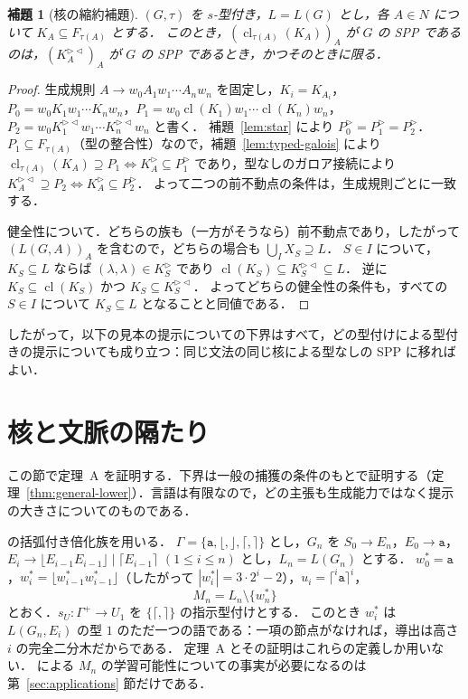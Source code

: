 \documentclass[11pt,a4paper]{ltjsarticle}
\numberwithin{equation}{section}
\theoremstyle{plain}
\newtheorem{lemma}[theorem]{補題}
\theoremstyle{definition}
\theoremstyle{remark}
\theoremstyle{plain}
\newcommand{\eps}{\lambda}
\newcommand{\R}{^{\rhd}}
\newcommand{\RL}{^{\rhd\lhd}}
\newcommand{\cl}{\operatorname{cl}}
\newcommand{\Lfl}{\lfloor}
\newcommand{\Rfl}{\rfloor}
\newcommand{\Lce}{\lceil}
\newcommand{\Rce}{\rceil}
\newcommand{\ta}{\mathtt a}
\begin{document}
\begin{lemma}[核の縮約補題]\label{lem:reduction}
$(G,\tau)$ を $s$-型付き，$L=L(G)$ とし，各 $A\in N$ について $K_A\subseteq F_{\tau(A)}$ とする．
このとき，$(\cl_{\tau(A)}(K_A))_A$ が $G$ の SPP であるのは，$(K_A\RL)_A$ が $G$ の SPP であるとき，かつそのときに限る．
\end{lemma}
\begin{proof}
生成規則 $A\to w_0A_1w_1\cdots A_nw_n$ を固定し，$K_i=K_{A_i}$，
$P_0=w_0K_1w_1\cdots K_nw_n$，$P_1=w_0\cl(K_1)w_1\cdots\cl(K_n)w_n$，$P_2=w_0K_1\RL w_1\cdots K_n\RL w_n$ と書く．
補題~\ref{lem:star} により $P_0\R=P_1\R=P_2\R$．
$P_1\subseteq F_{\tau(A)}$（型の整合性）なので，補題~\ref{lem:typed-galois} により
$\cl_{\tau(A)}(K_A)\supseteq P_1\iff K_A\R\subseteq P_1\R$ であり，型なしのガロア接続により $K_A\RL\supseteq P_2\iff K_A\R\subseteq P_2\R$．
よって二つの前不動点の条件は，生成規則ごとに一致する．

健全性について．どちらの族も（一方がそうなら）前不動点であり，したがって $(L(G,A))_A$ を含むので，どちらの場合も $\bigcup_I X_S\supseteq L$．
$S\in I$ について，$K_S\subseteq L$ ならば $(\eps,\eps)\in K_S\R$ であり $\cl(K_S)\subseteq K_S\RL\subseteq L$．
逆に $K_S\subseteq\cl(K_S)$ かつ $K_S\subseteq K_S\RL$．
よってどちらの健全性の条件も，すべての $S\in I$ について $K_S\subseteq L$ となることと同値である．
\end{proof}
したがって，以下の見本の提示についての下界はすべて，どの型付けによる型付きの提示についても成り立つ：同じ文法の同じ核による型なしの SPP に移ればよい．

\section{核と文脈の隔たり}\label{sec:deletion}

この節で定理~A を証明する．下界は一般の捕獲の条件のもとで証明する（定理~\ref{thm:general-lower}）．言語は有限なので，どの主張も生成能力ではなく提示の大きさについてのものである．

\citet[Sec.~6]{kuriyama-tcs1} の括弧付き倍化族を用いる．
$\Gamma=\{\ta,\Lfl,\Rfl,\Lce,\Rce\}$ とし，$G_n$ を
$S_0\to E_n$，$E_0\to\ta$，$E_i\to\Lfl E_{i-1}E_{i-1}\Rfl\mid\Lce E_{i-1}\Rce$ $(1\le i\le n)$ とし，$L_n=L(G_n)$ とする．
$w^*_0=\ta$，$w^*_i=\Lfl w^*_{i-1}w^*_{i-1}\Rfl$（したがって $|w^*_i|=3\cdot2^i-2$），$u_i=\Lce^i\ta\Rce^i$，
\[
M_n=L_n\setminus\{w^*_n\}
\]
とおく．$s_U:\Gamma^+\to U_1$ を $\{\Lce,\Rce\}$ の指示型付けとする．
このとき $w^*_i$ は $L(G_n,E_i)$ の型 $1$ のただ一つの語である：一項の節点がなければ，導出は高さ $i$ の完全二分木だからである．
定理~A とその証明はこれらの定義しか用いない．\citet{kuriyama-tcs1} による $M_n$ の学習可能性についての事実が必要になるのは第~\ref{sec:applications} 節だけである．
\end{document}
